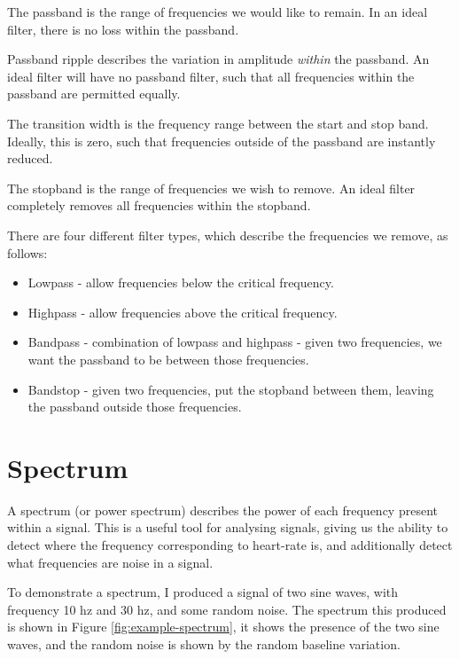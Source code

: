 \documentclass[12pt,a4paper,twoside,openright]{report}
\begin{document}
The passband is the range of frequencies we would like to remain. In an ideal
filter, there is no loss within the passband.

Passband ripple describes the variation in amplitude \emph{within} the
passband. An ideal filter will have no passband filter, such that all
frequencies within the passband are permitted equally.

The transition width is the frequency range between the start and stop band.
Ideally, this is zero, such that frequencies outside of the passband are
instantly reduced.

The stopband is the range of frequencies we wish to remove. An ideal filter
completely removes all frequencies within the stopband.

There are four different filter types, which describe the frequencies we remove, as
follows:

\begin{itemize}
	\item Lowpass - allow frequencies below the critical frequency.

	\item Highpass - allow frequencies above the critical frequency.

	\item Bandpass - combination of lowpass and highpass - given two
		frequencies, we want the passband to be between those
		frequencies.

	\item Bandstop - given two frequencies, put the stopband between them,
		leaving the passband outside those frequencies.
\end{itemize}

\section{Spectrum}

A spectrum (or power spectrum) describes the power of each frequency present
within a signal.
This is a useful tool for analysing signals, giving us the ability to detect
where the frequency corresponding to heart-rate is, and additionally detect
what frequencies are noise in a signal.

To demonstrate a spectrum, I produced a signal of two sine waves, with
frequency 10 hz
and 30 hz, and some random noise. The spectrum this produced is shown in 
Figure \ref{fig:example-spectrum}, it shows the presence of the two sine
waves, and the random noise is shown by the random baseline variation.
\end{document}
